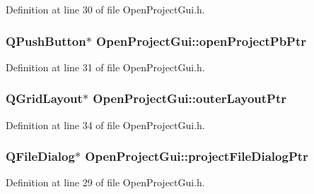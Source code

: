 Definition at line 30 of file Open\-Project\-Gui.\-h.

\hypertarget{class_open_project_gui_a4eeebb540cd48483c353106938c97ea3}{
\subsubsection[{open\-Project\-Pb\-Ptr}]{\setlength{\rightskip}{0pt plus 5cm}Q\-Push\-Button$\ast$ Open\-Project\-Gui\-::open\-Project\-Pb\-Ptr\hspace{0.3cm}{\ttfamily [private]}}}\label{class_open_project_gui_a4eeebb540cd48483c353106938c97ea3}


Definition at line 31 of file Open\-Project\-Gui.\-h.

\hypertarget{class_open_project_gui_ab83addd5cbd6d61872347b850c2d9981}{
\subsubsection[{outer\-Layout\-Ptr}]{\setlength{\rightskip}{0pt plus 5cm}Q\-Grid\-Layout$\ast$ Open\-Project\-Gui\-::outer\-Layout\-Ptr\hspace{0.3cm}{\ttfamily [private]}}}\label{class_open_project_gui_ab83addd5cbd6d61872347b850c2d9981}


Definition at line 34 of file Open\-Project\-Gui.\-h.

\hypertarget{class_open_project_gui_a897656f67bf72dedd1fca9fe1291b28d}{
\subsubsection[{project\-File\-Dialog\-Ptr}]{\setlength{\rightskip}{0pt plus 5cm}Q\-File\-Dialog$\ast$ Open\-Project\-Gui\-::project\-File\-Dialog\-Ptr\hspace{0.3cm}{\ttfamily [private]}}}\label{class_open_project_gui_a897656f67bf72dedd1fca9fe1291b28d}


Definition at line 29 of file Open\-Project\-Gui.\-h.

